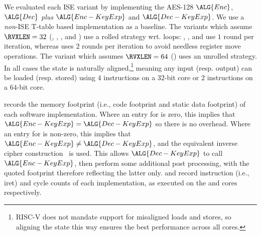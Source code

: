 
We evaluated each ISE variant by implementing the AES-128
$\ALG{Enc}$,
$\ALG{Dec}$
{\em plus}
$\ALG{Enc-KeyExp}$
and
$\ALG{Dec-KeyExp}$.
We use a {\em non}-ISE 
T-table based
implementation as a baseline.
The variants which assume  $\RVXLEN = 32$
(, ,     , and )
use a    rolled strategy wrt. loops:
 , ,              and 
use  $1$ round  per iteration,
whereas
uses $2$ rounds per iteration
to avoid needless register move operations.
The variant  which assumes $\RVXLEN = 64$
()
uses an unrolled strategy.
In all cases the state is naturally aligned,\footnote{%
RISC-V does not mandate support for misaligned loads and stores, so
aligning the state this way ensures the best performance across all
cores.
} meaning any input (resp. output) can be loaded (resp. stored) 
using 
$4$  instructions on a $32$-bit core
or
$2$  instructions on a $64$-bit core.

records the
memory footprint (i.e., code footprint and static data footprint)
of each software implementation.
Where an entry for
is     zero, this implies that
$\ALG{Enc-KeyExp} =    \ALG{Dec-KeyExp}$
so there is no overhead.
Where an entry for
is non-zero, this implies that
$\ALG{Enc-KeyExp} \neq \ALG{Dec-KeyExp}$,
and the equivalent inverse cipher construction~\cite[Section 5.3.5]{FIPS:197}
is used.
This allows $\ALG{Dec-KeyExp}$ to
call $\ALG{Enc-KeyExp}$,
then
perform some additional post processing,
with the quoted footprint therefore reflecting the latter only.  
and
record
instruction (i.e., iret) and cycle counts
of each implementation,
as executed on the  and  cores respectively.

